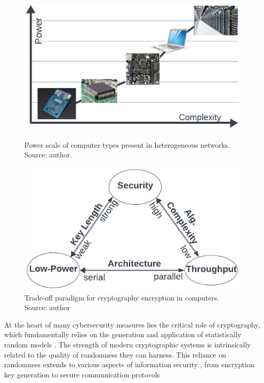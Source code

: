 \begin{figure}[h]
  \centering
  \begin{minipage}{0.45\linewidth}
    \centering
    \includegraphics[width=\linewidth]{unbtex-example/Complexity.pdf}
        \caption{Power scale of computer types present in heterogeneous networks. Source: author.}
    \label{fig:5a}
  \end{minipage}
  \hfill
  \begin{minipage}{0.45\linewidth}
    \centering
    \includegraphics[width=\linewidth]{unbtex-example/LWCparadigm.pdf}

    \caption{Trade-off paradigm for cryptography encryption in computers. Source: author}
    \label{fig:5b}
  \end{minipage}
\end{figure}


At the heart of many cybersecurity measures lies the critical role of cryptography, which fundamentally relies on the generation and application of statistically random models \cite{10.5555/2829193}. The strength of modern cryptographic systems is intrinsically related to the quality of randomness they can harness. This reliance on randomness extends to various aspects of information security \cite{Onuki2022}, from encryption key generation to secure communication protocols \cite{Wei.2024}

